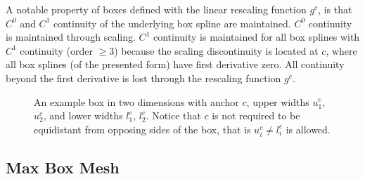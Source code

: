 A notable property of boxes defined with the linear rescaling function $g^c$, is that $C^0$ and $C^1$ continuity of the underlying box spline are maintained. $C^0$ continuity is maintained through scaling. $C^1$ continuity is maintained for all box splines with $C^1$ continuity (order $\geq 3$) because the scaling discontinuity is located at $c$, where all box splines (of the presented form) have first derivative zero. All continuity beyond the first derivative is lost through the rescaling function $g^c$.

\begin{figure}
  \centering
  \caption{An example box in two dimensions with anchor $c$, upper widths $u^c_1$, $u^c_2$, and lower widths $l^c_1$, $l^c_2$. Notice that $c$ is not required to be equidistant from opposing sides of the box, that is $u^c_i \not= l^c_i$ is allowed.}
  \label{fig_example_box}
\end{figure}

\subsection{Max Box Mesh}

